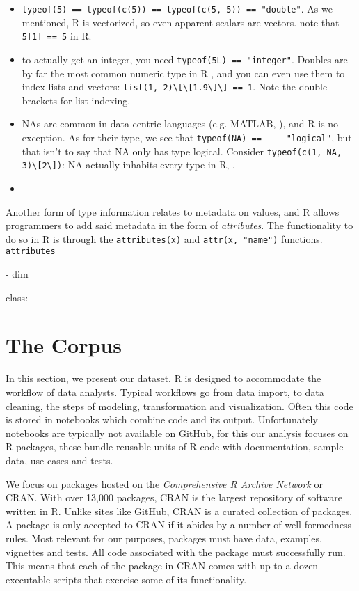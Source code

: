 \documentclass[acmsmall,10pt,review,anonymous]{acmart}\settopmatter{printfolios=true,printccs=false,printacmref=false}
\newcommand{\code}[1]{\lstinline|#1|\xspace}
\begin{document}
\begin{itemize}
\item \code{typeof(5) == typeof(c(5)) == typeof(c(5, 5)) == "double"}.  As
  we mentioned, R is vectorized, so even apparent scalars are vectors.
   note that \code{5[1] == 5} in R.
\item to actually get an integer, you need \code{typeof(5L) == "integer"}.
  Doubles are by far the most common numeric type in R , and you can even use them to index lists and vectors:
  \code{list(1, 2)\[\[1.9\]\] == 1}.  Note the double brackets for list
  indexing.
\item NAs are common in data-centric languages (e.g. MATLAB, ),
  and R is no exception.  As for their type, we see that \code{typeof(NA) ==
    "logical"}, but that isn't to say that NA only has type logical.
  Consider \code{typeof(c(1, NA, 3)\[2\])}: NA actually inhabits every type
  in R, .
\item {}
\end{itemize}

Another form of type information relates to metadata on values, and R allows
programmers to add said metadata in the form of {\it attributes}.  The
functionality to do so in R is through the \code{attributes(x)} and
\code{attr(x, "name")} functions.  \code{attributes}

  - dim

class:


\section{The Corpus}
\label{sec:corpus}

In this section, we present our dataset. R is designed to accommodate the
workflow of data analysts.  Typical workflows go from data import, to data
cleaning, the steps of modeling, transformation and visualization. Often
this code is stored in notebooks which combine code and its output.
Unfortunately notebooks are typically not available on GitHub, for this our
analysis focuses on R packages, these bundle reusable units of R code with
documentation, sample data, use-cases and tests.

We focus on packages hosted on the \emph{Comprehensive R Archive Network} or
CRAN.  With over 13,000 packages, CRAN is the largest repository of software
written in R. Unlike sites like GitHub, CRAN is a curated collection of
packages. A package is only accepted to CRAN if it abides by a number of
well-formedness rules.  Most relevant for our purposes, packages must have
data, examples, vignettes and tests. All code associated with the package
must successfully run. This means that each of the package in CRAN comes with
up to a dozen executable scripts that exercise some of its functionality.
\end{document}
